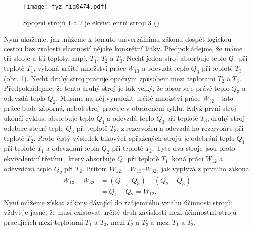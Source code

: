     \begin{figure}[ht!] %
      \centering
      \texttt{[image: fyz\_fig0474.pdf]}
      \caption{Spojení strojů 1 a 2 je ekvivalentní stroji 3 (\cite[s.~707]{Feynman01})}
      \label{fyz:fig0474}
    \end{figure}

    Nyní ukážeme, jak můžeme k tomuto univerzálnímu zákonu dospět logickou cestou bez znalosti
    vlastností nějaké konkrétní látky. Předpokládejme, že máme tři stroje a tři teploty, např.
    \(T_1\), \(T_2\) a \(T_3\). Nechť jeden stroj absorbuje teplo \(Q_1\) při teplotě \(T_1\),
    vykoná určité množství práce \(W_{13}\) a odevzdá teplo \(Q_3\) při teplotě \(T_3\) (obr.
    \ref{fyz:fig0474}). Nechť druhý stroj pracuje opačným způsobem mezi teplotami \(T_2\) a \(T_3\).
    Předpokládejme, že tento druhý stroj je tak velký, že absorbuje právě teplo \(Q_3\) a odevzdá
    teplo \(Q_2\). Musíme na něj vynaložit určité množství práce \(W_{32}\) - tato práce bude
    záporná, neboť stroj pracuje v obráceném cyklu. Když první stroj ukončí cyklus, absorbuje teplo
    \(Q_1\) a odevzdá teplo \(Q_3\) při teplotě \(T_3\); druhý stroj odebere stejné teplo \(Q_3\)
    při teplotě \(T_3\); z rezervoáru a odevzdá ho rezervoáru při teplotě \(T_2\). Proto čistý
    výsledek takových spřažených strojů je odebrání tepla \(Q_1\) při teplotě \(T_1\) a odevzdání
    tepla \(Q_2\) při teplotě \(T_2\). Tyto dva stroje jsou proto ekvivalentní třetímu, který
    absorbuje \(Q_1\) při teplotě \(T_1\), koná práci \(W_{12}\) a odevzdává teplo \(Q_2\) při
    \(T_2\). Přitom \(W_{12} = W_{13} – W_{32}\), jak vyplývá z prvního zákona
    \begin{align}
      W_{13}−W_{32}&=(Q_1-Q_3)-(Q_2-Q_3) \nonumber \\
                   &=Q_1-Q_2=W_{12}.     \label{fyz:eq678}
    \end{align}
    Nyní můžeme získat zákony dávající do vzájemného vztahu účinnosti strojů; vždyť je jasné, že
    musí existovat určitý druh závislosti mezi účinnostmi strojů pracujících mezi teplotami \(T_1\)
    a \(T_3\), mezi \(T_2\) a \(T_3\) a mezi \(T_1\) a \(T_2\).

